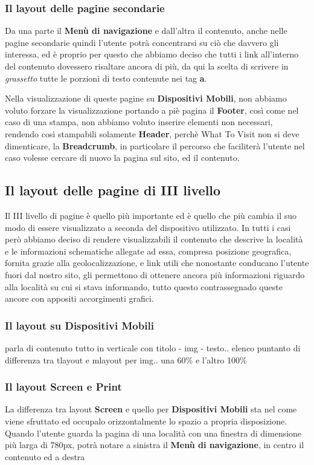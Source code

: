 \subsubsection{Il layout delle pagine secondarie}\label{sec:Pres-IIliv-sec}
Da una parte il \textbf{Menù di navigazione} e dall'altra il contenuto, anche nelle pagine secondarie quindi l'utente potrà concentrarsi su ciò che davvero gli interessa, ed è proprio per questo che abbiamo deciso che tutti i link all'interno del contenuto dovessero risaltare ancora di più, da qui la scelta di scrivere in \textit{grassetto} tutte le porzioni di testo contenute nei tag \textbf{a}.

Nella visualizzazione di queste pagine su \textbf{Dispositivi Mobili}, non abbiamo voluto forzare la visualizzazione portando a piè pagina il \textbf{Footer}, così come nel caso di una stampa, non abbiamo voluto inserire elementi non necessari, rendendo così stampabili solamente \textbf{Header}, perchè What To Visit non si deve dimenticare, la \textbf{Breadcrumb}, in particolare il percorso che faciliterà l'utente nel caso volesse cercare di nuovo la pagina sul sito, ed il contenuto.

\subsection{Il layout delle pagine di III livello}\label{sec:Pres-IIIliv}
Il III livello di pagine è quello più importante ed è quello che più cambia il suo modo di essere visualizzato a seconda del dispositivo utilizzato.
In tutti i casi però abbiamo deciso di rendere visualizzabili il contenuto che descrive la località e le informazioni schematiche allegate ad essa, compresa posizione geografica, fornita grazie alla geolocalizzazione, e link utili che nonostante conducano l'utente fuori dal nostro sito, gli permettono di ottenere ancora più informazioni riguardo alla località su cui si stava informando, tutto questo contrassegnado queste ancore con appositi accorgimenti grafici.

\subsubsection{Il layout su Dispositivi Mobili}\label{sec:Pres-IIliv-sec}
parla di contenuto tutto in verticale con titolo - img - testo..
elenco puntanto di differenza tra tlayout e mlayout per img.. una 60\% e l'altro 100\%






\subsubsection{Il layout Screen e Print}\label{sec:Pres-IIliv-sec}
La differenza tra layout \textbf{Screen} e quello per \textbf{Dispositivi Mobili} sta nel come viene sfruttato ed occupalo orizzontalmente lo spazio a propria disposizione.
Quando l'utente guarda la pagina di una località con una finestra di dimensione più larga di 780px, potrà notare a sinistra il \textbf{Menù di navigazione}, in centro il contenuto ed a destra